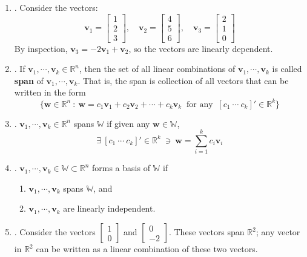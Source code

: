 \documentclass[12pt]{article}
\begin{document}
\begin{enumerate}
\begin{enumerate}
	\item\underline{}.
		Consider the vectors:
		\[\mathbf{{v}}_1=\begin{bmatrix}1\\2\\3\end{bmatrix},\quad\mathbf{{v}}_2=\begin{bmatrix}4\\5\\6\end{bmatrix},
			\quad\mathbf{{v}}_3=\begin{bmatrix}2\\1\\0\end{bmatrix}\]
		By inspection, $\mathbf{{v}}_3=-2\mathbf{{v}}_1+\mathbf{{v}}_2$, so the vectors are linearly dependent.

	\item\underline{}.
		If $\mathbf{{v}}_1,\cdots,\mathbf{{v}}_k\in\mathbb{R}^n$, then the set of all linear combinations of $\mathbf{{v}}_1,\cdots,\mathbf{{v}}_k$ is called \textbf{span} of $\mathbf{{v}}_1,\cdots,\mathbf{{v}}_k$. That is, the span is collection of all vectors that can be
		written in the form 
			\[ \Big\{ \mathbf{{w}} \in \mathbb{R}^n \ : \ \mathbf{{w}} = c_1\mathbf{{v}}_1+c_2\mathbf{{v}}_2+\cdots+c_k\mathbf{{v}}_k \ \text{  for any  } \ [ c_1 \ \cdots \ c_k ]' \in \mathbb{R}^k \Big\}\]
		
	\item\underline{}.
		$\mathbf{{v}}_1,\cdots,\mathbf{{v}}_k\in\mathbb{R}^n$ spans $\mathbb{W}$ if given any $\mathbf{{w}} \in \mathbb{W}$,
		\[ \exists \ [c_1 \ \cdots \ c_k]' \in \mathbb{R}^k \ \ni \ \mathbf{{w}} = \sum_{i=1}^k c_i \mathbf{{v}}_i \]
		
	\item\underline{}.
	$\mathbf{{v}}_1,\cdots,\mathbf{{v}}_k\in \mathbb{W} \subset \mathbb{R}^n$ forms a basis of $\mathbb{W}$ if 
		\begin{enumerate}
			\item $\mathbf{{v}}_1,\cdots,\mathbf{{v}}_k$ spans $\mathbb{W}$, and 
			\item $\mathbf{{v}}_1,\cdots,\mathbf{{v}}_k$ are linearly independent. 
		\end{enumerate} 
		
	\item\underline{}.
	Consider the vectors $\begin{bmatrix}1 \\ 0\end{bmatrix}$ and $\begin{bmatrix}0 \\ -2\end{bmatrix}$. These vectors span
	$\mathbb{R}^2$; any vector in $\mathbb{R}^2$ can be written as a linear combination of these two vectors.
	

\end{enumerate}
\end{enumerate}
\end{document}
